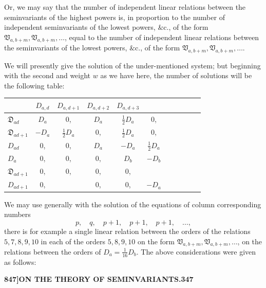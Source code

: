 \documentclass[12pt,a4paper]{article}
\theoremstyle{definition}
\begin{document}
Or, we may say that the number of independent linear relations between the seminvariants of the highest powers is, in proportion to the number of independent seminvariants of the lowest powers, $\&\text{c.}$, of the form $\mathfrak{V}_{a,b+m}, \mathfrak{V}_{a,b+m}, \ldots$, equal to the number of independent linear relations between the seminvariants of the lowest powers, $\&\text{c.}$, of the form $\mathfrak{V}_{a,b+m}, \mathfrak{V}_{a,b+m}, \ldots$.

We will presently give the solution of the under-mentioned system; but beginning with the second and weight $w$ as we have here, the number of solutions will be the following table:

\medskip

\begin{center}
\small
\begin{tabular}{l|cccccccccc}
& $D_{a,d}$ & $D_{a,d+1}$ & $D_{a,d+2}$ & $D_{a,d+3}$ & & & & & & \\
\hline
$\mathfrak{D}_{ad}$ & $D_a$ & $0$, & $D_a$ & $\frac{1}{2}D_a$ & $0$, & & & & & \\
$\mathfrak{D}_{ad+1}$ & $-D_a$ & $\frac{1}{2}D_a$ & $0$, & $\frac{1}{2}D_a$ & $0$, & & & & & \\
$D_{ad}$ & $0$, & $0$, & $D_a$ & $-D_a$ & $\frac{1}{2}D_a$ & & & & & \\
$D_a$ & $0$, & $0$, & $0$, & $D_b$ & $-D_b$ & & & & & \\
$\mathfrak{D}_{ad+1}$ & $0$, & $0$, & $0$, & $0$, & & & & & & \\
$D_{ad+1}$ & $0$, & & $0$, & $0$, & $-D_a$ & & & & & \\
\end{tabular}
\end{center}
\medskip

We may use generally with the solution of the equations of column corresponding numbers
\[
p, \quad q, \quad p + 1, \quad p + 1, \quad p + 1, \quad \ldots,
\]
there is for example a single linear relation between the orders of the relations $5, 7, 8, 9, 10$ in each of the orders $5, 8, 9, 10$ on the form $\mathfrak{V}_{a,b+m}, \mathfrak{V}_{a,b+m}, \ldots$, on the relations between the orders of $D_a = \frac{1}{16}D_b$. The above considerations were given as follows:

\newpage
\setcounter{page}{347}

\noindent\textbf{847]}\hfill\textbf{ON THE THEORY OF SEMINVARIANTS.}\hfill\textbf{347}

\bigskip
\end{document}
